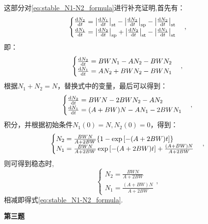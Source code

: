 \documentclass[12pt, a4paper, oneside]{ctexart}
\begin{document}
	\begin{footnotesize}
		这部分对\eqref{eq:stable_N1-N2_formula}进行补充证明,首先有：
		$$
		\begin{cases}
			\dv{N_2}{t} = \abs{\dv{N_1}{t}}_{\mathrm{st}} - \abs{\dv{N_2}{t}}_{\mathrm{sp}} -\abs{\dv{N_2}{t}}_{\mathrm{st}} \\
			\dv{N_1}{t} = \abs{\dv{N_2}{t}}_{\mathrm{sp}} +\abs{\dv{N_2}{t}}_{\mathrm{st}}  - \abs{\dv{N_1}{t}}_{\mathrm{st}}
		\end{cases},
		$$
		即：
		$$
		\begin{cases}
			\dv{N_2}{t} = BWN_1 - AN_2 - BWN_2 \\
			\dv{N_1}{t} = AN_2 + BWN_2 - BWN_1
		\end{cases},
		$$
		根据$N_1+N_2 = N$，替换式中的变量，最后可以得到：
		$$
		\begin{cases}
			\dv{N_2}{t} = BWN - 2BWN_2 - AN_2 \\
			\dv{N_1}{t} = (A+BW)N - AN_1 - 2BWN_1
		\end{cases},
		$$
		积分，并根据初始条件$N_1(0) = N,N_2(0) = 0$，得到：
		$$
		\begin{cases}
			N_2 = \frac{BWN}{A+2BW} \qty{1 - \exp\qty[-(A+2BW)t]} \\
			N_1 = \frac{BWN}{A+2BW} \exp\qty[-(A+2BW)t] + \frac{(A+BW)N}{A+2BW}
		\end{cases},
		$$
		则可得到稳态时,
		$$
		\begin{cases}
			N_2 = \frac{BWN}{A+2BW} \\
			N_1 = \frac{(A+BW)N}{A+2BW}
		\end{cases},
		$$
		相减即得式\eqref{eq:stable_N1-N2_formula}.
	\end{footnotesize}
	
	\begin{center}
		\textbf{第三题}
	\end{center}
	
\end{document}
